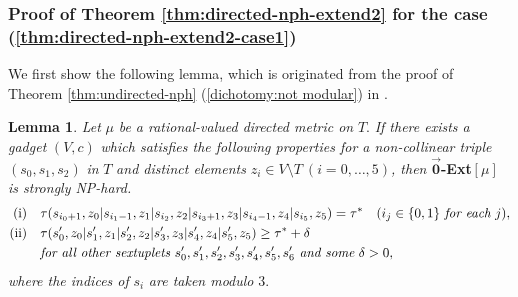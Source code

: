 \documentclass[11pt]{article}
\theoremstyle{definition}
\newtheorem{lemma}[theorem]{Lemma}
\begin{document}
\subsubsection{Proof of Theorem \ref{thm:directed-nph-extend2} for the case (\ref{thm:directed-nph-extend2-case1})}
We first show the following lemma, which is originated from the proof of Theorem \ref{thm:undirected-nph} (\ref{dichotomy:not modular}) in \cite{karzanov2004}.
\begin{lemma}
\label{lem:nphcondition2}
\textit{Let} $\mu$ \textit{be a rational-valued directed metric on }$T$. \textit{If there exists a gadget} $(V,c)$ \textit{which satisfies the following properties for a non-collinear triple} $(s_0,s_1,s_2)$ \textit{in} $T$ \textit{and distinct elements} $z_i\in V\setminus T\ (i=0,\ldots,5)$\textit{, then} $\overrightarrow{\textbf{0}}$\textbf{-Ext}$[\mu]$ \textit{is strongly NP-hard.}
\begin{align}
\label{nphcondition2}
\mathrm{(i)}& \mathrm{\ \ \ }\tau(s_{i_0+1},z_0|s_{i_1-1},z_1|s_{i_2},z_2|s_{i_3+1},z_3|s_{i_4-1},z_4|s_{i_5},z_5)=\tau^*\mathrm{\ \ \ }(i_j\in \{0,1\}\mathrm{\ \textit{for\ each}\ }j),\notag\\
\mathrm{(ii)}& \mathrm{\ \ \ }\tau(s'_0,z_0|s'_1,z_1|s'_2,z_2|s'_3,z_3|s'_4,z_4|s'_5,z_5)\geq \tau^*+\delta \notag \\&\mathrm{\ \ \ }\mathrm{\textit{for\ all\ other\ sextuplets\ }}s_0',s_1',s_2',s_3',s_4',s_5',s_6'\mathrm{\textit{\ and\ some}\ \delta>0},
\end{align}
\textit{where the indices of }$s_i$ \textit{are taken modulo }3.
\end{lemma}
\end{document}
